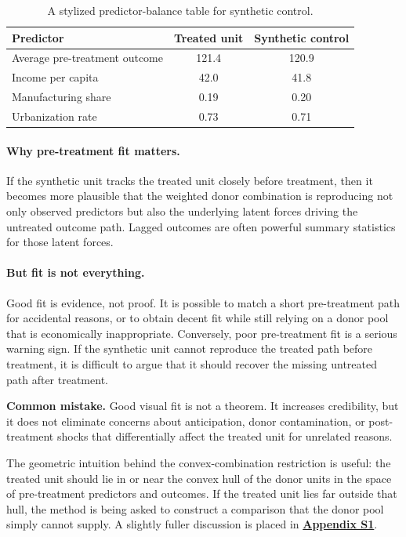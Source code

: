 \begin{table}[h]
\centering
\small
\begin{tabular}{lcc}
\toprule
Predictor & Treated unit & Synthetic control \\
\midrule
Average pre-treatment outcome & 121.4 & 120.9 \\
Income per capita & 42.0 & 41.8 \\
Manufacturing share & 0.19 & 0.20 \\
Urbanization rate & 0.73 & 0.71 \\
\bottomrule
\end{tabular}
\caption{A stylized predictor-balance table for synthetic control.}
\label{tab:sc_balance}
\end{table}

\paragraph{Why pre-treatment fit matters.}
If the synthetic unit tracks the treated unit closely before treatment, then it becomes more plausible that the weighted donor combination is reproducing not only observed predictors but also the underlying latent forces driving the untreated outcome path. Lagged outcomes are often powerful summary statistics for those latent forces.

\paragraph{But fit is not everything.}
Good fit is evidence, not proof. It is possible to match a short pre-treatment path for accidental reasons, or to obtain decent fit while still relying on a donor pool that is economically inappropriate. Conversely, poor pre-treatment fit is a serious warning sign. If the synthetic unit cannot reproduce the treated path before treatment, it is difficult to argue that it should recover the missing untreated path after treatment.

\begin{boxF}
\textbf{Common mistake.}
Good visual fit is not a theorem. It increases credibility, but it does not eliminate concerns about anticipation, donor contamination, or post-treatment shocks that differentially affect the treated unit for unrelated reasons.
\end{boxF}

The geometric intuition behind the convex-combination restriction is useful: the treated unit should lie in or near the convex hull of the donor units in the space of pre-treatment predictors and outcomes. If the treated unit lies far outside that hull, the method is being asked to construct a comparison that the donor pool simply cannot supply. A slightly fuller discussion is placed in \hyperlink{app:sc-geom}{\textbf{Appendix S1}}.

